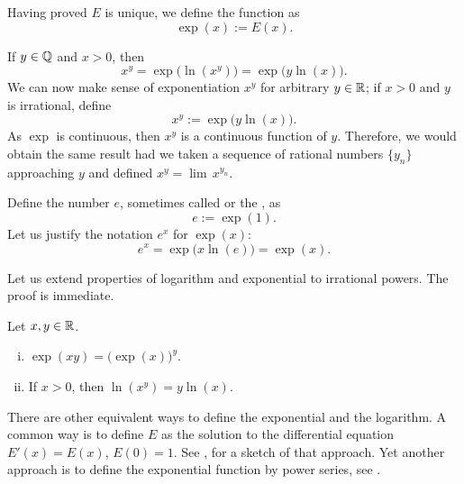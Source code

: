 Having proved $E$ is unique, we define the
\emph{} function as
\begin{equation*}
\exp(x) := E(x) .
\end{equation*}

If $y \in {\mathbb{Q}}$ and $x > 0$, then
\begin{equation*}
x^y = \exp\bigl(\ln(x^y)\bigr) = \exp\bigl(y\ln(x)\bigr) .
\end{equation*}
We can now make sense of exponentiation $x^y$ for arbitrary $y \in {\mathbb{R}}$;
if $x > 0$ and $y$ is irrational, define
\begin{equation*}
x^y := \exp\bigl(y\ln(x)\bigr) .
\end{equation*}
As $\exp$ is continuous, then $x^y$ is a continuous function of $y$.
Therefore, we would
obtain the same result had we taken a sequence of rational numbers $\{ y_n \}$
approaching $y$ and defined $x^y = \lim\, x^{y_n}$.

Define the number $e$,
sometimes called \emph{} or
the \emph{}, as
\begin{equation*}
e := \exp(1) .
\end{equation*}
Let us justify the notation $e^x$ for $\exp(x)$:
\begin{equation*}
e^x = \exp\bigl(x \ln(e) \bigr) = \exp(x) .
\end{equation*}

Let us extend properties of logarithm and exponential to
irrational powers.  The proof is immediate.

\begin{prop}
Let $x, y \in {\mathbb{R}}$.
\begin{enumerate}[(i)]
\item
$\exp(xy) = {\bigl(\exp(x)\bigr)}^y$.
\item
If $x > 0$, then $\ln(x^y) = y \ln (x)$.
\end{enumerate}
\end{prop}

\begin{remark}
There are other equivalent ways to define the exponential and the logarithm.
A common way is to define $E$ as the solution to the differential equation
$E'(x) = E(x)$, $E(0) = 1$.  See ,
for a sketch of that approach.  Yet another
approach is to define the exponential function by
power series, see .
\end{remark}

